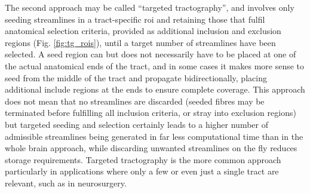 The second approach may be called ``targeted tractography'', and involves only seeding streamlines in a tract-specific \gls{roi} and retaining those that fulfil anatomical selection criteria, provided as additional inclusion and exclusion regions (Fig. \ref{fig:tg_rois}), until a target number of streamlines have been selected.
A seed region can but does not necessarily have to be placed at one of the actual anatomical ends of the tract, and in some cases it makes more sense to seed from the middle of the tract and propagate bidirectionally, placing additional include regions at the ends to ensure complete coverage.
This approach does not mean that no streamlines are discarded (seeded fibres may be terminated before fulfilling all inclusion criteria, or stray into exclusion regions) but targeted seeding and selection certainly leads to a higher number of admissible streamlines being generated in far less computational time than in the whole brain approach, while discarding unwanted streamlines on the fly reduces storage requirements.
Targeted tractography is the more common approach particularly in applications where only a few or even just a single tract are relevant, such as in neurosurgery\autocite{Yang2021}.

